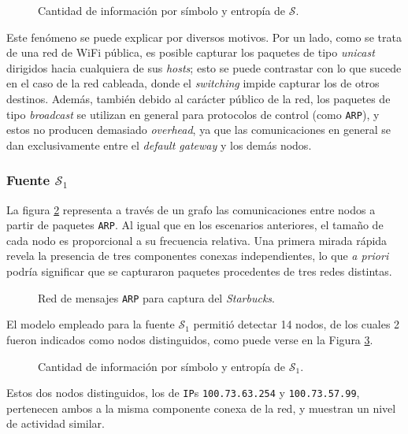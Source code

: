 \begin{figure}[H]
    \caption{Cantidad de información por símbolo y entropía de $\mathcal{S}$.}
    \label{res:esc3:s}
\end{figure}

Este fenómeno se puede explicar por diversos motivos. Por un lado, como se
trata de una red de WiFi pública, es posible capturar los paquetes de tipo
\emph{unicast} dirigidos hacia cualquiera de sus \emph{hosts}; esto se puede
contrastar con lo que sucede en el caso de la red cableada, donde el
\emph{switching} impide capturar los de otros destinos. Además, también debido
al carácter público de la red, los paquetes de tipo
\emph{broadcast} se utilizan en general para protocolos de control (como
\texttt{ARP}), y estos no producen demasiado \emph{overhead}, ya que las
comunicaciones en general se dan exclusivamente entre el \emph{default gateway}
y los demás nodos.

\subsubsection{Fuente $\mathcal{S}_1$}

La figura \ref{res:esc3:graph} representa a través de un grafo las
comunicaciones entre nodos a partir de paquetes \texttt{ARP}. Al igual que
en los escenarios anteriores, el tamaño de cada nodo es proporcional a su
frecuencia relativa. Una primera mirada rápida revela la presencia de tres
componentes conexas independientes, lo que \emph{a priori} podría significar
que se capturaron paquetes procedentes de tres redes distintas.

\begin{figure}[H]
    \caption{Red de mensajes \texttt{ARP} para captura del \emph{Starbucks}.}
    \label{res:esc3:graph}
\end{figure}

El modelo empleado para la fuente $\mathcal{S}_1$ permitió detectar 14 nodos,
de los cuales 2 fueron indicados como nodos distinguidos, como puede verse
en la Figura \ref{res:esc3:s1}.

\begin{figure}[H]
    \caption{Cantidad de información por símbolo y entropía de $\mathcal{S}_1$.}
    \label{res:esc3:s1}
\end{figure}

Estos dos nodos distinguidos, los de \texttt{IP}s \texttt{100.73.63.254} y
\texttt{100.73.57.99}, pertenecen ambos a la misma componente conexa de la
red, y muestran un nivel de actividad similar. 